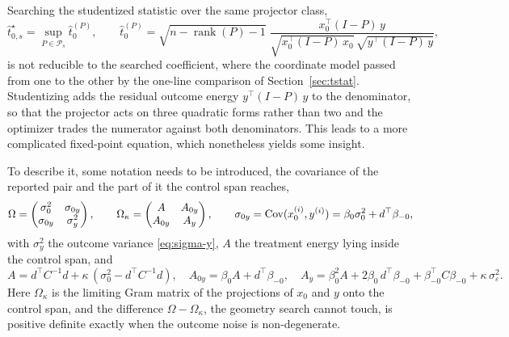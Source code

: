 
Searching the studentized statistic over the same projector class,
\begin{equation}\label{eq:cont-tstat}
        \hat t_{0,s}^\star
        =
        \sup_{P \in \mathcal{P}_s} \hat t_0^{(P)},
        \qquad
        \hat t_0^{(P)}
        =
        \sqrt{n - \operatorname{rank}(P) - 1}\;
        \frac{x_0^\top (I - P)\, y}
        {\sqrt{x_0^\top (I - P)\, x_0}\,\sqrt{y^\top (I - P)\, y}},
\end{equation}
is not reducible to the searched coefficient, where the coordinate model
passed from one to the other by the one-line comparison of
Section~\ref{sec:tstat}. Studentizing adds the residual outcome energy
$y^\top (I - P)\, y$ to the denominator, so that the projector acts on
three quadratic forms rather than two and the optimizer trades the
numerator against both denominators. This leads to a more complicated fixed-point
equation, which nonetheless yields some insight.

To describe it, some notation needs to be introduced, the covariance
of the reported pair and the part of it the control span reaches,
\begin{equation}\label{eq:cont-gram}
        \Omega
        =
        \begin{pmatrix}
        \sigma_0^2 & \sigma_{0y} \\ \sigma_{0y} & \sigma_y^2
        \end{pmatrix},
        \qquad
        \Omega_\kappa
        =
        \begin{pmatrix}
        A & A_{0y} \\ A_{0y} & A_y
        \end{pmatrix},
        \qquad
        \sigma_{0y} = \operatorname{Cov}(x_0^{(i)}, y^{(i)})
        = \beta_0 \sigma_0^2 + d^\top \beta_{-0},
\end{equation}
with $\sigma_y^2$ the outcome variance \eqref{eq:sigma-y}, $A$ the
treatment energy lying inside the control span, and
\begin{equation}\label{eq:cont-gram-span}
        A = d^\top C^{-1} d + \kappa\,(\sigma_0^2 - d^\top C^{-1} d),
        \quad
        A_{0y} = \beta_0 A + d^\top \beta_{-0},
        \quad
        A_y = \beta_0^2 A + 2 \beta_0\, d^\top \beta_{-0}
        + \beta_{-0}^\top C \beta_{-0} + \kappa\, \sigma_\varepsilon^2 .
\end{equation}
Here $\Omega_\kappa$ is the limiting Gram matrix of the projections of
$x_0$ and $y$ onto the control span, and the difference
$\Omega - \Omega_\kappa$, the geometry search cannot touch, is positive
definite exactly when the outcome noise is non-degenerate.

